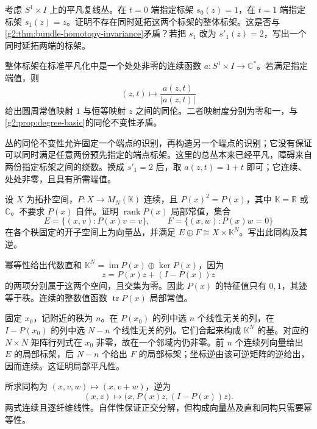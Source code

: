 \begin{exercise}\label{g2:ex:two-end-trivializations-obstruction}
	考虑 \(S^1\times I\) 上的平凡复线丛。在 \(t=0\) 端指定标架 \(s_0(z)=1\)，在 \(t=1\) 端指定标架 \(s_1(z)=z\)。证明不存在同时延拓这两个标架的整体标架。这是否与\cref{g2:thm:bundle-homotopy-invariance}矛盾？若把 \(s_1\) 改为 \(s'_1(z)=2\)，写出一个同时延拓两端的标架。
\end{exercise}
\begin{solution}
	整体标架在标准平凡化中是一个处处非零的连续函数 \(a:S^1\times I\to\mathbb C^*\)。若满足指定端值，则
	\[
		(z,t)\longmapsto\frac{a(z,t)}{|a(z,t)|}
	\]
	给出圆周常值映射 \(1\) 与恒等映射 \(z\) 之间的同伦。二者映射度分别为零和一，与\cref{g2:prop:degree-basic}的同伦不变性矛盾。

	丛的同伦不变性允许固定一个端点的识别，再构造另一个端点的识别；它没有保证可以同时满足任意两份预先指定的端点标架。这里的总丛本来已经平凡，障碍来自两份指定标架之间的绕数。换成 \(s'_1=2\) 后，取 \(a(z,t)=1+t\) 即可；它连续、处处非零，且具有所需端值。
\end{solution}

\begin{exercise}\label{g2:ex:continuous-idempotent-bundles}
	设 \(X\) 为拓扑空间，\(P:X\to M_N(\mathbb K)\) 连续，且 \(P(x)^2=P(x)\)，其中 \(\mathbb K=\mathbb R\) 或 \(\mathbb C\)。不要求 \(P(x)\) 自伴。证明 \(\operatorname{rank}P(x)\) 局部常值，集合
	\[
		E=\{(x,v):P(x)v=v\},\qquad
		F=\{(x,w):P(x)w=0\}
	\]
	在各个秩固定的开子空间上为向量丛，并满足 \(E\oplus F\cong X\times\mathbb K^N\)。写出此同构及其逆。
\end{exercise}
\begin{solution}
	幂等性给出代数直和 \(\mathbb K^N=\operatorname{im}P(x)\oplus\ker P(x)\)，因为
	\[
		z=P(x)z+(I-P(x))z
	\]
	的两项分别属于这两个空间，且交集为零。因此 \(P(x)\) 的特征值只有 \(0,1\)，其迹等于秩。连续的整数值函数 \(\operatorname{tr}P(x)\) 局部常值。

	固定 \(x_0\)，记附近的秩为 \(n\)。在 \(P(x_0)\) 的列中选 \(n\) 个线性无关的列，在 \(I-P(x_0)\) 的列中选 \(N-n\) 个线性无关的列。它们合起来构成 \(\mathbb K^N\) 的基。对应的 \(N\times N\) 矩阵行列式在 \(x_0\) 非零，故在一个邻域内仍非零。前 \(n\) 个连续列向量给出 \(E\) 的局部标架，后 \(N-n\) 个给出 \(F\) 的局部标架；坐标逆由该可逆矩阵的逆给出，因而连续。这证明局部平凡性。

	所求同构为 \((x,v,w)\mapsto(x,v+w)\)，逆为
	\[
		(x,z)\longmapsto\bigl(x,P(x)z,(I-P(x))z\bigr).
	\]
	两式连续且逐纤维线性。自伴性保证正交分解，但构成向量丛及直和同构只需要幂等性。
\end{solution}

